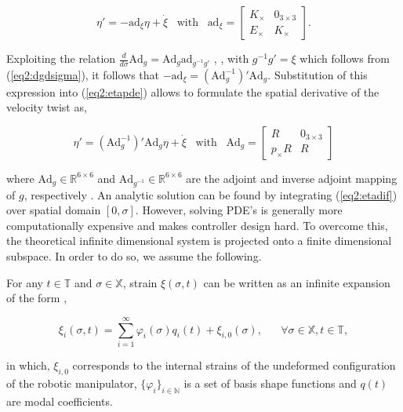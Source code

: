 \begin{equation}
    \eta'= -\text{ad}_\xi \eta + \Dot{\xi} \hspace{10pt} \text{with} \hspace{10pt} \text{ad}_{\xi} = \begin{bmatrix} K_\times & 0_{3\times 3} \\ E_\times & K_\times \end{bmatrix}.
    \label{eq2:etapde}
\end{equation}


Exploiting the relation $\frac{d}{d \sigma} \text{Ad}_g = \text{Ad}_g \text{ad}_{g^{-1}g'}$ \cite{Boyer2019}, \cite{traversaro2016multibody} , with $g^{-1}g' = \xi$ which follows from (\ref{eq2:dgdsigma}), it follows that $-\text{ad}_\xi = (\text{Ad}_g^{-1})'\text{Ad}_g$. Substitution of this expression into (\ref{eq2:etapde}) allows to formulate the spatial derivative of the velocity twist as,

\begin{equation}
    \eta'= (\text{Ad}_g^{-1})'\text{Ad}_g \eta + \Dot{\xi} \hspace{10pt} \text{with} \hspace{10pt} \text{Ad}_g = \begin{bmatrix} R & 0_{3\times 3} \\ p_\times R & R \end{bmatrix}
    \label{eq2:etadif}
\end{equation}

where $\text{Ad}_g \in \mathbb{R}^{6 \times 6}$ and $\text{Ad}_{g^{-1}}  \in \mathbb{R}^{6 \times 6}$ are the adjoint and inverse adjoint mapping of $g$, respectively \cite{Sola2018}. An analytic solution can be found by integrating (\ref{eq2:etadif}) over spatial domain $[0,\sigma]$. However, solving PDE's is generally more computationally expensive and makes controller design hard.
To overcome this, the theoretical infinite dimensional system is projected onto a finite dimensional subspace. In order to do so, we assume the following.


\begin{theorem}

For any $t \in \mathbb{T}$ and $\sigma \in \mathbb{X}$, strain $\xi(\sigma,t)$ can be written as an infinite expansion of the form \cite{Caasenbrood2021},

\begin{equation}
\xi_i(\sigma,t) = \sum_{i=1}^\infty \varphi_i(\sigma)q_i(t) + \xi_{i,0}(\sigma), \hspace{20pt} \forall \sigma \in \mathbb{X}, t \in \mathbb{T},
\label{eq2:strainexact}
\end{equation}

in which, $\xi_{i,0}$ corresponds to the internal strains of the undeformed configuration of the robotic manipulator, $\{\varphi_i\}_{i \in \mathbb{N}}$ is a set of basis shape functions and $q(t)$ are modal coefficients. 
\end{theorem}

